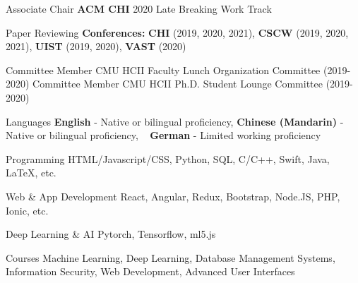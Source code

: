 
\begin{cvskills}
  \cvskill
    {Associate Chair} %
    {
      \textbf{ACM CHI} 2020 Late Breaking Work Track
    } 

  \cvskill
    {Paper Reviewing} %
    {
      \textbf{Conferences:} \textbf{CHI} (2019, 2020, 2021), \textbf{CSCW} (2019, 2020, 2021), \textbf{UIST} (2019, 2020), \textbf{VAST} (2020)
    } 

\end{cvskills}

\begin{cvskills}
  \cvskill
    {Committee Member} %
    {
      CMU HCII Faculty Lunch Organization Committee (2019-2020)
    } 
  \cvskill
    {Committee Member} %
    {
      CMU HCII Ph.D. Student Lounge Committee (2019-2020)
    } 

\end{cvskills}







\begin{cvskills}
  \cvskill
    {Languages} %
    {\textbf{English} - Native or bilingual proficiency, \textbf{Chinese (Mandarin)} - Native or bilingual proficiency, } 
  \cvskill
    {~} %
    {\textbf{German} - Limited working proficiency} 
  
  \cvskill
    {Programming} %
    {HTML/Javascript/CSS, Python, SQL, C/C++, Swift, Java, LaTeX, etc. } 

  \cvskill
    {Web \& App Development} %
    {React, Angular, Redux, Bootstrap, Node.JS, PHP, Ionic, etc.} 

  \cvskill
    {Deep Learning \& AI}
    {Pytorch, Tensorflow, ml5.js} 

  \cvskill
    {Courses} %
    {Machine Learning, Deep Learning, Database Management Systems, Information Security, Web Development, Advanced User Interfaces} 
\end{cvskills}
